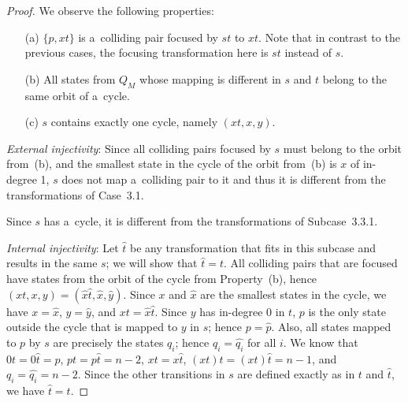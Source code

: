\documentclass{amsart}
\newcommand{\e}[1]{\hat{#1}}
\begin{document}
\begin{proof}
We observe the following properties:
\begin{enumerate}
\item[(a)] $\{p,xt\}$ is a~colliding pair focused by $st$ to $xt$.
Note that in contrast to the previous cases, the focusing transformation here is $st$ instead of $s$.

\item[(b)] All states from $Q_M$ whose mapping is different in $s$ and $t$ belong to the same orbit of a~cycle.

\item[(c)] $s$ contains exactly one cycle, namely $(xt,x,y)$.
\end{enumerate}

\textit{External injectivity}:
Since all colliding pairs focused by $s$ must belong to the orbit from~(b), and the smallest state in the cycle of the orbit from~(b) is $x$ of in-degree 1, $s$ does not map a~colliding pair to it and thus it is different from the transformations of Case~3.1.

Since $s$ has a~cycle, it is different from the transformations of Subcase~3.3.1.

\textit{Internal injectivity}:
Let $\e{t}$ be any transformation that fits in this subcase and results in the same $s$; we will show that $\e{t}=t$.
All colliding pairs that are focused have states from the orbit of the cycle from Property~(b), hence $(xt,x,y) = (\e{x}\e{t},\e{x},\e{y})$.
Since $x$ and $\e{x}$ are the smallest states in the cycle, we have $x = \e{x}$, $y = \e{y}$, and $xt = \e{x}\e{t}$.
Since $y$ has in-degree 0 in $t$, $p$ is the only state outside the cycle that is mapped to $y$ in $s$; hence $p = \e{p}$.
Also, all states mapped to $p$ by $s$ are precisely the states $q_i$; hence $q_i = \e{q_i}$ for all $i$.
We know that $0t = 0\e{t} = p$, $pt = p\e{t} = n-2$, $xt = x\e{t}$, $(xt)t = (xt)\e{t} = n-1$, and $q_i = \e{q_i} = n-2$.
Since the other transitions in $s$ are defined exactly as in $t$ and $\e{t}$, we have $\e{t}=t$.


\end{proof}
\end{document}
